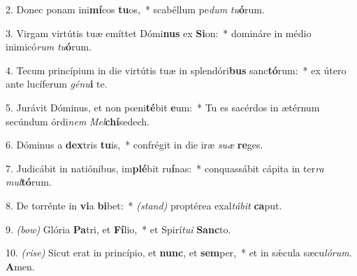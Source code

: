 2. Donec ponam ini\textbf{mí}cos \textbf{tu}os,~*
	scabéllum pe\textit{dum} \textit{tu}\textbf{ó}rum.

3. Virgam virtútis tuæ emíttet Dómi\textbf{nus} ex \textbf{Si}on:~*
	domináre in médio inimicó\textit{rum} \textit{tu}\textbf{ó}rum.

4. Tecum princípium in die virtútis tuæ in splendóri\textbf{bus} sanc\textbf{tó}rum:~*
	ex útero ante lucíferum \textit{gé}\textit{nu}\textbf{i} te.

5. Jurávit Dóminus, et non p{\oe}ni\textbf{té}\-bit \textbf{e}um:~*
	Tu es sacérdos in ætérnum secúndum órdi\textit{nem} \textit{Mel}\textbf{chí}se\-dech.

6. Dóminus a \textbf{dex}tris \textbf{tu}is,~*
	confrégit in die iræ \textit{su}\textit{æ} \textbf{re}ges.

7. Judicábit in natiónibus, im\textbf{plé}bit ru\textbf{í}nas:~*
	conquassábit cápita in ter\textit{ra} \textit{mul}\textbf{tó}rum.

8. De torrénte in \textbf{vi}a \textbf{bi}bet:~* {\color{red}\textit{(stand)}}
	proptérea exal\textit{tá}\textit{bit} \textbf{ca}put.

9. {\color{red}\textit{(bow)}} Glória \textbf{Pa}tri, et \textbf{Fí}lio,~*
	et Spirí\textit{tu}\textit{i} \textbf{Sanc}to.

10. {\color{red}\textit{(rise)}} Sicut erat in princípio, et \textbf{nunc}, et \textbf{sem}per,~*
	et in s\'{\ae}cula sæcu\textit{ló}\textit{rum}. \textbf{A}men.